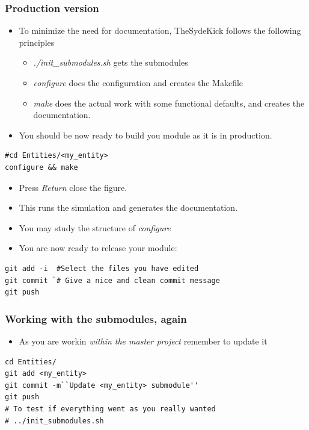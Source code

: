\documentclass[logo=bluequo,normaltitle]{aaltoslides}
\begin{document}
\begin{frame}[t,fragile]
    \frametitle{Production version } 
    \begin{itemize}
        \item To minimize the need for documentation, TheSydeKick follows the
            following principles
            \begin{itemize}
                \item \emph{./init\_submodules.sh} gets the submodules
                \item \emph{configure} does the configuration and creates the
                    Makefile
                \item \emph{make} does the actual work with some functional
                    defaults, and creates the documentation.
            \end{itemize}
        \item You should be now ready to build you module as it is in
            production.
    \end{itemize}
\begin{lstlisting}
#cd Entities/<my_entity>
configure && make
\end{lstlisting}
    \begin{itemize}
        \item Press \emph{Return} close the figure.
        \item This runs the simulation and generates the documentation. 
        \item You may study the structure of \emph{configure}
        \item You are now ready to release your module:
    \end{itemize}
\begin{lstlisting}
git add -i  #Select the files you have edited
git commit `# Give a nice and clean commit message
git push    
\end{lstlisting}
\end{frame}

\begin{frame}[t,fragile]
    \frametitle{Working with the submodules, again} 
    \begin{itemize}
        \item As you are workin \emph{within the master project}
                remember to update it
    \end{itemize}
\begin{lstlisting}
cd Entities/
git add <my_entity>
git commit -m``Update <my_entity> submodule''
git push
# To test if everything went as you really wanted
# ../init_submodules.sh
\end{lstlisting}
\end{frame}

\end{document}
